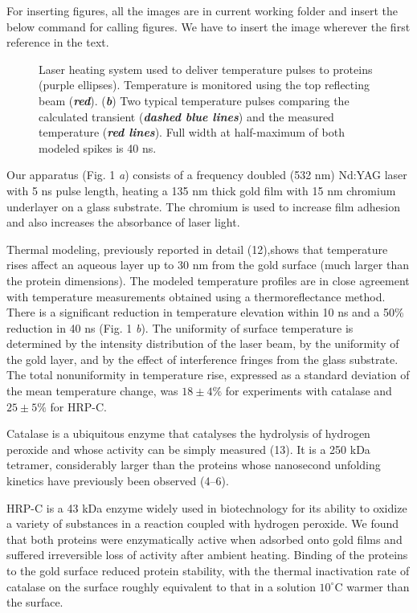 \documentclass{biophys}
\begin{document}
For inserting figures, all the images are in current working folder and insert the below command
for calling figures. We have to insert the image wherever the first reference in the text.

\begin{figure}[t!]
\centering{
\rule{2cm}{2cm} %
}
\caption{Laser heating system used to deliver temperature pulses to proteins (purple ellipses). Temperature is monitored using the top reflecting beam ({\bfseries\itshape red}). ({\bfseries\itshape b}) Two typical temperature pulses comparing the calculated transient ({\bfseries\itshape dashed blue lines}) and the measured temperature ({\bfseries\itshape red lines}). Full width at half-maximum  of both modeled spikes is 40 ns.}
\end{figure}


Our apparatus (Fig. 1 {\it a}) consists of a frequency doubled (532 nm) Nd:YAG laser with 5 ns pulse length, heating a 135 nm thick gold film with 15 nm chromium underlayer on a glass substrate. The chromium is used to increase film adhesion and also increases the absorbance of laser light.

Thermal modeling, previously reported in detail (12),\break shows that temperature rises affect an aqueous layer up to 30 nm from the gold surface (much larger than the protein dimensions). The modeled temperature profiles are in close agreement with temperature measurements obtained using a thermoreflectance method. There is a significant reduction in temperature elevation within 10 ns and a 50\% reduction in 40 ns (Fig. 1 {\it b}). The uniformity of surface temperature is determined by the intensity distribution of the laser beam, by the uniformity of the gold layer, and by the effect of interference fringes from the glass substrate. The total nonuniformity in temperature rise, expressed as a standard deviation of the mean temperature change, was $18 \pm 4\%$ for experiments with catalase and $25 \pm 5\%$ for HRP-C.

Catalase is a ubiquitous enzyme that catalyses the hydrolysis of hydrogen peroxide and whose activity can be simply measured (13). It is a 250 kDa tetramer, considerably larger than the proteins whose nanosecond unfolding kinetics have previously been observed (4--6).

HRP-C is a 43 kDa enzyme widely used in biotechnology for its ability to oxidize a variety of substances in a reaction coupled with hydrogen peroxide. We found that both proteins were enzymatically active when adsorbed onto gold films and suffered irreversible loss of activity after ambient heating. Binding of the proteins to the gold surface reduced protein stability, with the thermal inactivation rate of catalase on the surface roughly equivalent to that in a solution $10^\circ$C warmer than the surface.
\end{document}
